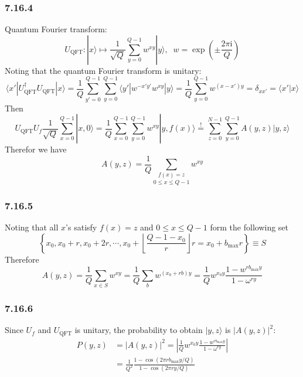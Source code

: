 \documentclass[]{ctexart}
\begin{document}
\subsubsection*{7.16.4}
Quantum Fourier transform: 
\begin{equation*}
U_{\text{QFT}}:|x\rangle\mapsto\frac{1}{\sqrt{Q}}\sum_{y=0}^{Q-1}w^{xy}|y\rangle,\;\;w=\exp\left(\pm\frac{2\pi\mathrm{i}}{Q}\right)
\end{equation*}
Noting that the quantum Fourier transform is unitary: 
\begin{equation*}
\langle x'|U_{\text{QFT}}^\dagger U_\text{QFT}|x\rangle=\frac{1}{Q}\sum_{y'=0}^{Q-1}\sum_{y=0}^{Q-1}\langle y'|w^{-x'y'}w^{xy}|y\rangle=\frac{1}{Q}\sum_{y=0}^{Q-1}w^{(x-x')y}=\delta_{xx'}=\langle x'|x\rangle
\end{equation*}
Then 
\begin{equation*}
U_\text{QFT}U_f\frac{1}{\sqrt{Q}}\sum_{x=0}^{Q-1}|x,0\rangle=\frac{1}{Q}\sum_{x=0}^{Q-1}\sum_{y=0}^{Q-1}w^{xy}|y,f(x)\rangle\overset{!}{=}\sum_{z=0}^{N-1}\sum_{y=0}^{Q-1}A(y,z)|y,z\rangle
\end{equation*}
Therefor we have 
\begin{equation*}
A(y,z)=\frac{1}{Q}\underset{0\le x\le Q-1}{\sum_{f(x)=z}}w^{xy}
\end{equation*}
\subsubsection*{7.16.5}
Noting that all $x$'s satisfy $f(x)=z$ and $0\le x\le Q-1$ form the following set
\begin{equation*}
\left\{x_0,x_0+r,x_0+2r,\cdots,x_0+\left\lfloor\frac{Q-1-x_0}{r}\right\rfloor r=x_0+b_\text{max} r\right\}\equiv S
\end{equation*}
Therefore 
\begin{equation*}
A(y,z)=\frac{1}{Q}\sum_{x\in S}w^{xy}=\frac{1}{Q}\sum_{b}w^{(x_0+rb)y}=\frac{1}{Q}w^{x_0y}\frac{1-w^{rb_\text{max} y}}{1-\omega^{ry}}
\end{equation*}
\subsubsection*{7.16.6}
Since $U_f$ and $U_\text{QFT}$ is unitary, the probability to obtain $|y,z\rangle$ is $|A(y,z)|^2$: 
\begin{align*}
P(y,z)&=|A(y,z)|^2=\left|\frac{1}{Q}w^{x_0y}\frac{1-w^{rb_\text{max} y}}{1-\omega^{ry}}\right|\\
&=\frac{1}{Q^2}\frac{1-\cos(2\pi rb_{\text{max}}y/Q)}{1-\cos(2\pi ry/Q)}
\end{align*}
\end{document}
